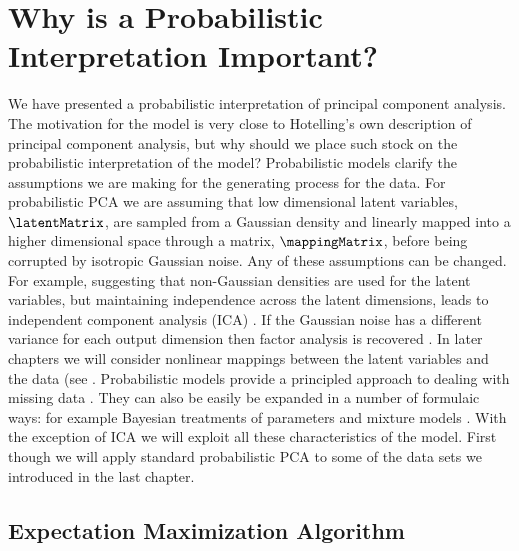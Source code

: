 \section{Why is a Probabilistic Interpretation Important?}

We have presented a probabilistic interpretation of principal
component analysis. The motivation for the model is very close to
Hotelling's own description of principal component analysis, but why
should we place such stock on the probabilistic interpretation of the
model? Probabilistic models clarify the assumptions we are making for
the generating process for the data. For probabilistic PCA we are
assuming that low dimensional latent variables, $\latentMatrix$, are
sampled from a Gaussian density and linearly mapped into a higher
dimensional space through a matrix, $\mappingMatrix$, before being
corrupted by isotropic Gaussian noise. Any of these assumptions can be
changed. For example, suggesting that non-Gaussian densities are used
for the latent variables, but maintaining independence across the
latent dimensions, leads to independent component
analysis (ICA)
\citep{MacKay:ica96,Hyvarinen:icabook01}. If the Gaussian noise has a
different variance for each output dimension then factor
analysis is recovered
\citep{Roweis:unifying}. In later chapters we will consider nonlinear
mappings between the latent variables and the data (see
. Probabilistic models provide a
principled approach to dealing with missing data
\citep{Tipping:probpca99}. They can also be easily be expanded in a
number of formulaic ways: for example Bayesian treatments of
parameters \citep{Bishop:bayesPCA98,Bishop:icann99,Minka:automatic01}
and mixture models
\citep{Tipping:pca97,Ghahramani:emmixtures97,Ghahramani:bfa00}. With
the exception of ICA we will exploit all these characteristics of the
model. First though we will apply standard probabilistic
PCA to some of the data sets we
introduced in the last chapter.

\subsection{Expectation Maximization Algorithm}

